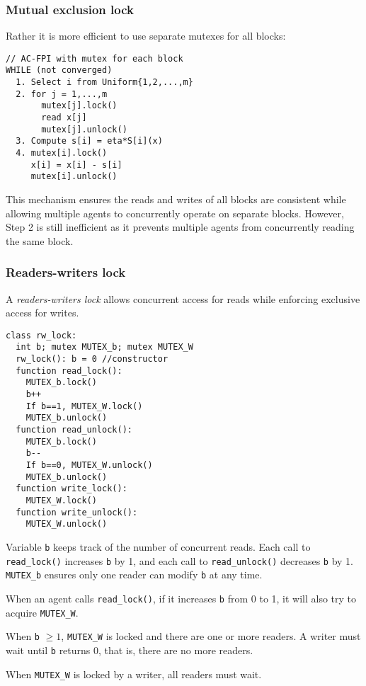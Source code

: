 \documentclass[10pt,mathserif]{beamer}
\begin{document}
\begin{frame}[fragile]
\frametitle{Mutual exclusion lock}


Rather it is more efficient to use separate mutexes for all blocks:
\begin{lstlisting}
// AC-FPI with mutex for each block
WHILE (not converged)
  1. Select i from Uniform{1,2,...,m}
  2. for j = 1,...,m
       mutex[j].lock()
       read x[j]
       mutex[j].unlock()
  3. Compute s[i] = eta*S[i](x)
  4. mutex[i].lock()
     x[i] = x[i] - s[i]
     mutex[i].unlock()
\end{lstlisting}
This mechanism ensures the reads and writes of all blocks are consistent while allowing multiple agents to concurrently operate on separate blocks.
However, Step 2 is still inefficient as it prevents multiple agents from concurrently reading the same block.


\end{frame}

\begin{frame}
\frametitle{Readers-writers lock}
A \emph{readers-writers lock} allows concurrent access for reads while enforcing exclusive access for writes.
\begin{lstlisting}
class rw_lock:
  int b; mutex MUTEX_b; mutex MUTEX_W
  rw_lock(): b = 0 //constructor
  function read_lock():
    MUTEX_b.lock()
    b++
    If b==1, MUTEX_W.lock()
    MUTEX_b.unlock()
  function read_unlock():
    MUTEX_b.lock()
    b--
    If b==0, MUTEX_W.unlock()
    MUTEX_b.unlock()
  function write_lock():
    MUTEX_W.lock()
  function write_unlock():
    MUTEX_W.unlock()
\end{lstlisting}

\end{frame}

\begin{frame}[fragile]
    Variable \verb|b| keeps track of the number of concurrent reads. Each call to \verb|read_lock()| increases \verb|b| by 1, and each call to \verb|read_unlock()| decreases \verb|b| by 1. \verb|MUTEX_b| ensures only one reader can modify \verb|b| at any time.
    \medskip

    When an agent calls \verb|read_lock()|, if it increases \verb|b| from 0 to 1, it will also try to acquire \verb|MUTEX_W|. %
    \medskip
    
    When \verb|b| $\ge 1$, \verb|MUTEX_W| is locked and there are one or more readers. A writer must wait until \verb|b| returns 0, that is, there are no more readers.
    \medskip

    When \verb|MUTEX_W| is locked by a writer, all readers must wait.
    
\end{frame}
\end{document}
